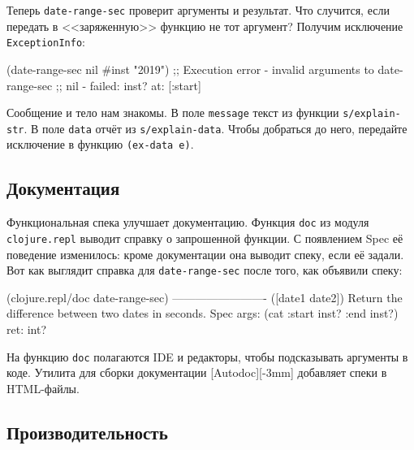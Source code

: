 Теперь \verb|date-range-sec| проверит аргументы и результат. Что случится,
если передать в <<заряженную>> функцию не тот аргумент? Получим исключение
\verb|ExceptionInfo|:

\begin{english}
  \begin{clojure}
(date-range-sec nil #inst "2019")
;; Execution error - invalid arguments to date-range-sec
;; nil - failed: inst? at: [:start]
  \end{clojure}
\end{english}


Сообщение и тело нам знакомы. В поле \verb|message| текст из функции
\verb|s/explain-str|. В поле \verb|data| отчёт из
\verb|s/explain-data|. Чтобы добраться до него, передайте исключение в функцию
\verb|(ex-data e)|.

\subsection{Документация}


Функциональная спека улучшает документацию. Функция \verb|doc| из модуля
\verb|clojure.repl| выводит справку о запрошенной функции. С появлением Spec
её поведение изменилось: кроме документации она выводит спеку, если её
задали. Вот как выглядит справка для \verb|date-range-sec| после того, как
объявили спеку:

\begin{english}
  \begin{clojure}
(clojure.repl/doc date-range-sec)
-------------------------
([date1 date2])
  Return the difference between two dates in seconds.
Spec
  args: (cat :start inst? :end inst?)
  ret: int?
  \end{clojure}
\end{english}


На функцию \verb|doc| полагаются IDE и редакторы, чтобы подсказывать аргументы
в коде. Утилита для сборки документации [Autodoc][-3mm]
добавляет спеки в HTML-файлы.

\subsection{Производительность}

